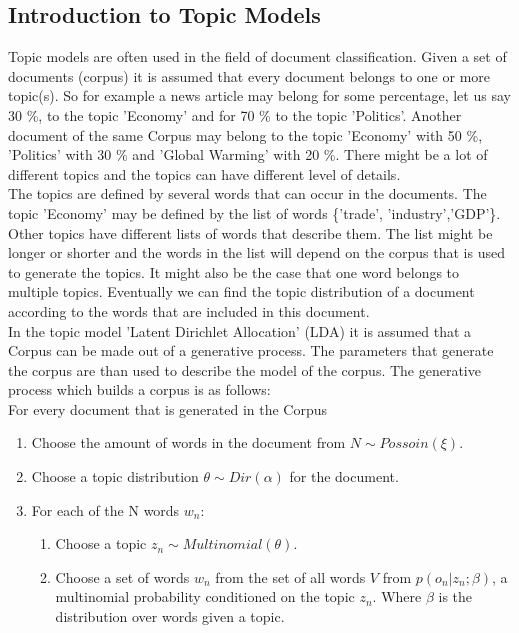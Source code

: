 \documentclass[11pt,a4paper]{article}
\begin{document}
\subsection{Introduction to Topic Models}
Topic models are often used in the field of document classification. Given a set of documents (corpus) it is assumed that every document belongs to one or more topic(s). So for example a news article may belong for some percentage, let us say 30 \%,  to the topic 'Economy' and for 70 \%  to the topic 'Politics'. Another document of the same Corpus may belong to the topic 'Economy' with 50 \%, 'Politics' with 30 \% and 'Global Warming' with 20 \%. There might be a lot of different topics and the topics can have different level of details. \\
The topics are defined by several words that can occur in the documents. The topic 'Economy' may be defined by the list of words \{'trade', 'industry','GDP'\}. Other topics have different lists of words that describe them. The list might be longer or shorter and the words in the list will depend on the corpus that is used to generate the topics. It might also be the case that one word belongs to multiple topics. Eventually we can find the topic distribution of a document according to the words that are included in this document.\\
In the topic model 'Latent Dirichlet Allocation' (LDA) it is assumed that a Corpus can be made out of a generative process. The parameters that generate the corpus are than used to describe the model of the corpus. The generative process which builds a corpus is as follows:\\
For every document that is generated in the Corpus
\begin{enumerate}
 \item Choose the amount of words in the document from $N \sim Possoin(\xi)$.
 \item Choose a topic distribution $\theta \sim Dir(\alpha)$ for the document.
 \item For each of the N words $w_n$:
 
 \begin{enumerate}
  \item Choose a topic $z_n \sim Multinomial(\theta)$.
  \item Choose a set of words $w_n$ from the set of all words $V$ from $p(o_n |z_n;\beta)$, a multinomial probability conditioned on the topic $z_n$. Where $\beta$ is the distribution over words given a topic.
 \end{enumerate}

\end{enumerate}
\end{document}
